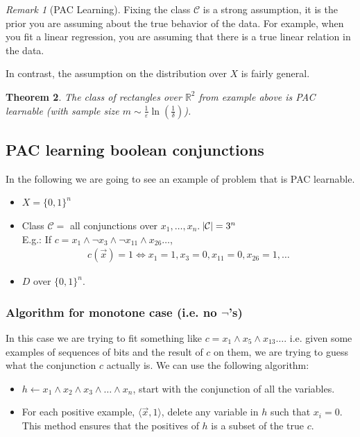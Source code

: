 \documentclass[12pt, letterpaper]{article}
\numberwithin{equation}{section} %
\newcommand{\R}{\mathbb{R}}
\newcommand{\mc}{\mathcal}
\newcommand{\ve}{\varepsilon}
\newtheorem{theorem}{Theorem}[section]
\theoremstyle{definition}
\theoremstyle{remark}
\newtheorem{remark}[theorem]{Remark}
\begin{document}
\begin{remark}[PAC Learning]
    Fixing the class $\mc C$ is a strong assumption, it is the prior you are assuming about the true behavior of the data.
     For example, when you fit a linear regression, you are assuming that there is a true linear relation in the data.

    In contrast, the assumption on the distribution over $X$ is fairly general.
\end{remark}

\begin{theorem}
    The class of rectangles over $\R^2$ from example above is PAC learnable (with sample size $m\sim\frac1\ve\ln\left(\frac1\delta\right)$).
\end{theorem}

\subsection{PAC learning boolean conjunctions}

In the following we are going to see an example of problem that is PAC learnable.
\begin{itemize}
    \item $X = \lbrace 0, 1 \rbrace^n$
    \item Class $\mc C = $ all conjunctions over $x_1,\ldots,x_n$. $\abs{\mc C} = 3^n$\\
          E.g.: If $c = x_1\wedge \lnot x_3 \wedge \lnot x_{11} \wedge x_{26} \ldots$,
          \begin{align}
              c(\vec x) = 1 \iff x_1 =1, x_3 = 0, x_{11} = 0, x_{26} = 1, \ldots
          \end{align}
    \item $D$ over $\lbrace 0, 1 \rbrace^n$.
\end{itemize}


\subsubsection[Algorithm for monotone case]{Algorithm for monotone case (i.e. no $\lnot$'s)}

In this case we are trying to fit something like $c = x_1\wedge x_5 \wedge x_{13} \ldots$. i.e. given some examples of sequences of bits and the result of $c$ on them, we are trying to guess what the conjunction $c$ actually is.
We can use the following algorithm:
\begin{itemize}
    \item $h \leftarrow x_1\wedge x_2 \wedge x_3\wedge \ldots \wedge x_n$, start with the conjunction of all the variables.
    \item For each positive example, $\langle \vec x, 1 \rangle$, delete any variable in $h$ such that $x_i=0$.\\
    This method ensures that the positives of $h$ is a subset of the true $c$.
\end{itemize}
\end{document}
